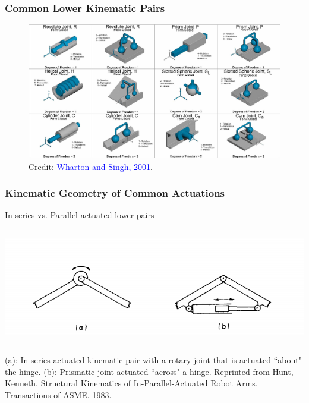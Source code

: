 \begin{frame}
	\frametitle{Common Lower Kinematic Pairs}
	\begin{figure}[t]
		\centering
		\includegraphics[width=\columnwidth]{figures/pairs.jpg}
		Credit: \href{https://www.semanticscholar.org/paper/Development-of-Solid-Models-and-Multimedia-of-Pairs-Wharton-Singh/7ba9c2f3cfed5a493bb5828976689764d024b087}{\textcolor{blue}{Wharton and Singh,  2001}}.
	\end{figure}
\end{frame}
	
	
\begin{frame}
	\frametitle{Kinematic Geometry of Common Actuations}
	\begin{block}{In-series vs. Parallel-actuated lower pairs}
		\begin{columns}[t]
			\begin{column}{10cm}
				\centering
				\includegraphics[width=\textwidth]{../Notes/figures/arms_hunt.png}
			\end{column}
		\end{columns}
		\footnotesize{(a): In-series-actuated kinematic pair with a rotary joint that is actuated ``about" the hinge. (b): Prismatic joint actuated ``across" a hinge. Reprinted from Hunt, Kenneth. Structural Kinematics of In-Parallel-Actuated Robot Arms. Transactions of ASME. 1983. }
	\end{block}
\end{frame}
		
